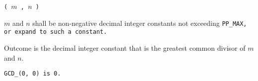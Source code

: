 
 \tt{(} $m$ \tt{,} $n$ \tt{)}


$m$ and $n$ shall be non-negative decimal integer constants
not exceeding \tt{PP_MAX}, or expand to such a constant.


Outcome is the decimal integer constant that
is the greatest common divisor of $m$ and $n$.

\note \tt{GCD_(0, 0)} is \tt{0}.
